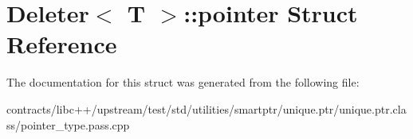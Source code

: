 \hypertarget{struct_deleter_1_1pointer}{}\section{Deleter$<$ T $>$\+:\+:pointer Struct Reference}
\label{struct_deleter_1_1pointer}


The documentation for this struct was generated from the following file\+:\begin{DoxyCompactItemize}
\item 
contracts/libc++/upstream/test/std/utilities/smartptr/unique.\+ptr/unique.\+ptr.\+class/pointer\+\_\+type.\+pass.\+cpp\end{DoxyCompactItemize}
